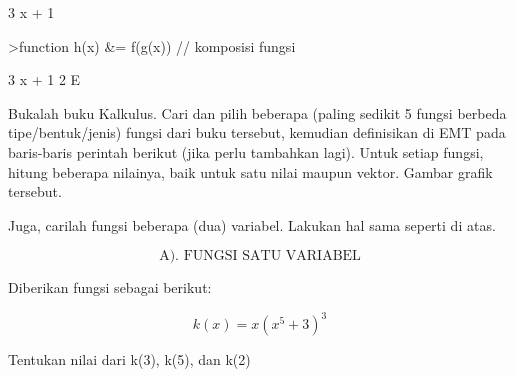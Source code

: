 \documentclass{article}
\begin{document}
\begin{eulernotebook}
\begin{euleroutput}
                                 3 x + 1
  
\end{euleroutput}
\begin{eulerprompt}
>function h(x) &= f(g(x)) // komposisi fungsi
\end{eulerprompt}
\begin{euleroutput}
  
                                   3 x + 1
                                2 E
  
\end{euleroutput}
\begin{eulercomment}
Bukalah buku Kalkulus. Cari dan pilih beberapa (paling sedikit 5
fungsi berbeda tipe/bentuk/jenis) fungsi dari buku tersebut, kemudian
definisikan di EMT pada baris-baris perintah berikut (jika perlu
tambahkan lagi). Untuk setiap fungsi, hitung beberapa nilainya, baik
untuk satu nilai maupun vektor. Gambar grafik tersebut.

Juga, carilah fungsi beberapa (dua) variabel. Lakukan hal sama seperti
di atas.

\end{eulercomment}
\begin{eulerformula}
\[
\text{A). FUNGSI SATU VARIABEL}
\]
\end{eulerformula}
\begin{eulercomment}
\end{eulercomment}
\eulersubheading{}
\begin{eulercomment}
Diberikan fungsi sebagai berikut:

\end{eulercomment}
\begin{eulerformula}
\[
k(x)=x(x^5+3)^3
\]
\end{eulerformula}
\begin{eulercomment}
Tentukan nilai dari k(3), k(5), dan k(2)


\end{eulercomment}
\end{eulernotebook}
\end{document}
